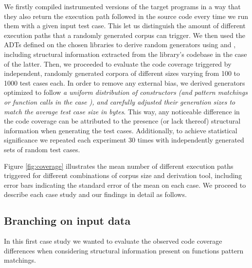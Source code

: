 We firstly compiled instrumented versions of the target programs in a way that
they also return the execution path followed in the source code every time we
run them with a given input test case.
%
This let us distinguish the amount of different execution paths that a randomly
generated corpus can trigger.
%
We then used the ADTs defined on the chosen libraries to derive random
generators using \dragen and \dragenp, including structural information
extracted from the library's codebase in the case of the latter.
%
Then, we proceeded to evaluate the code coverage triggered by independent,
randomly generated corpora of different sizes varying from 100 to 1000 test
cases each.
%
In order to remove any external bias, we derived generators optimized to follow
\emph{a uniform distribution of constructors (and pattern matchings or function
  calls in the case \dragenp), and carefully adjusted their generation sizes to
  match the average test case size in bytes}.
%
This way, any noticeable difference in the code coverage can be attributed to
the presence (or lack thereof) structural information when generating the test
cases.
%
Additionally, to achieve statistical significance we repeated each experiment 30
times with independently generated sets of random test cases.

\begin{figure*}[t]
  \vspace{-5pt}%
  \centering
  
  \hspace{5pt}%
  
  \caption{Path coverage comparison between \dragen (\ref{exp:dragen}) and
    \dragenp (\ref{exp:dragenp}). }
  \label{fig:coverage}
  \vspace{-10pt}%
\end{figure*}
%
Figure \ref{fig:coverage} illustrates the mean number of different execution
paths triggered for different combinations of corpus size and derivation tool,
including error bars indicating the standard error of the mean on each case.
%
We proceed to describe each case study and our findings in detail as follows.

\subsection{Branching on input data}

In this first case study we wanted to evaluate the observed code coverage
differences when considering structural information present on functions pattern
matchings.


